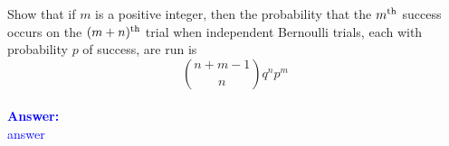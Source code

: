 \item{}
Show that if $m$ is a positive integer, then the probability that the $m^{\rm
th}$ success occurs on the $(m+n)^{\rm th}$ trial when independent Bernoulli
trials, each with probability $p$ of success, are run is $${n+m-1\choose n}q^n
p^m$$\\[12pt]
\ifanswers
\textcolor{blue}{
\textbf{Answer:}\\[6pt]
answer
}
\newpage
\fi
